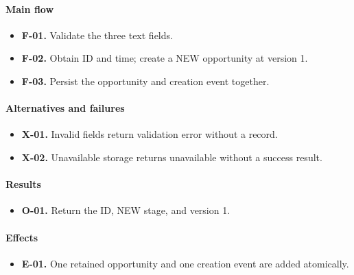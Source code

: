 \documentclass[10pt,a4paper]{article}
\begin{document}
\paragraph{Main flow}

\begin{itemize}

\item \textbf{F-01.} Validate the three text fields.

\item \textbf{F-02.} Obtain ID and time; create a NEW opportunity at version 1.

\item \textbf{F-03.} Persist the opportunity and creation event together.

\end{itemize}

\paragraph{Alternatives and failures}

\begin{itemize}

\item \textbf{X-01.} Invalid fields return validation error without a record.

\item \textbf{X-02.} Unavailable storage returns unavailable without a success result.

\end{itemize}

\paragraph{Results}

\begin{itemize}

\item \textbf{O-01.} Return the ID, NEW stage, and version 1.

\end{itemize}

\paragraph{Effects}

\begin{itemize}

\item \textbf{E-01.} One retained opportunity and one creation event are added atomically.

\end{itemize}
\end{document}
